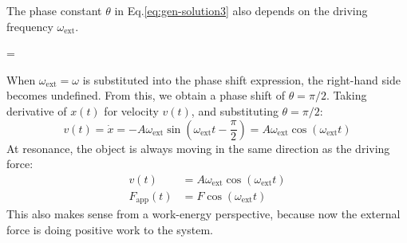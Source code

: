 The phase constant $\theta$ in Eq.\ref{eq:gen-solution3} also depends on the
driving frequency $\omega_\text{ext}$.
\begin{important-equation}
  \tan\theta=
  \label{eq:forced-oscillator-phase-shift}
\end{important-equation}
When $\omega_\text{ext}=\omega$ is substituted into the phase shift expression,
the right-hand side becomes undefined. From this, we obtain a phase shift of
$\theta=\pi/2$. Taking derivative of $x(t)$ for velocity $v(t)$, and
substituting $\theta=\pi/2$:
\begin{equation}
  v(t)=\dot x
  =-A\omega_\text{ext}\sin(\omega_\text{ext}t-\frac{\pi}2)
  =A\omega_\text{ext}\cos(\omega_\text{ext}t)
\end{equation}
At resonance, the object is always moving in the same direction as the
driving force:
\begin{align*}
  v(t)&=A\omega_\text{ext}\cos(\omega_\text{ext}t)\\
  F_\text{app}(t)&=F\cos(\omega_\text{ext}t)
\end{align*}
This also makes sense from a work-energy perspective, because now the external
force is doing positive work to the system.

%
